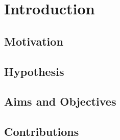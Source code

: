 \chapter{Introduction}
\label{chp:intro}

\section{Motivation}


\section{Hypothesis}


\section{Aims and Objectives}


\section{Contributions}